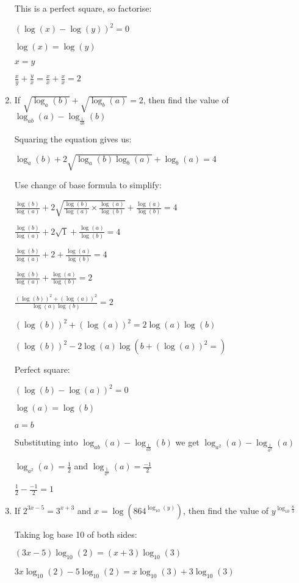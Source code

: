 \documentclass[../main.tex]{subfiles}
\begin{document}
\begin{enumerate}[itemsep=0.4cm]
    This is a perfect square, so factorise:

    \((\log(x)-\log(y))^2=0\)

    \(\log(x)=\log(y)\)

    \(x=y\)

    \(\frac{x}{y}+\frac{y}{x}=\frac{x}{x}+\frac{x}{x}=2\)

    \item 
    If $\sqrt{\log_a(b)}+\sqrt{\log_b(a)}=2$, then find the value of $\log_{ab}(a)-\log_{\frac{1}{ab}}(b)$

    Squaring the equation gives us:

    \(\log_a(b)+2\sqrt{\log_a(b)\log_b(a)}+\log_b(a)=4\)

    Use change of base formula to simplify:

    \(\frac{\log(b)}{\log(a)}+2\sqrt{\frac{\log(b)}{\log(a)}\times \frac{\log(a)}{\log(b)}}+\frac{\log(a)}{\log(b)}=4 \)

    \(\frac{\log(b)}{\log(a)}+2\sqrt{1}+\frac{\log(a)}{\log(b)}=4 \)

    \(\frac{\log(b)}{\log(a)}+2+\frac{\log(a)}{\log(b)}=4 \)

    \(\frac{\log(b)}{\log(a)}+\frac{\log(a)}{\log(b)}=2 \)

    \(\frac{(\log(b))^2+(\log(a))^2}{\log(a)\log(b)} =2\)

    \((\log(b))^2+(\log(a))^2=2\log(a)\log(b)\)

    \((\log(b))^2-2\log(a)\log(b+(\log(a))^2=)\)

    Perfect square:

    \((\log(b)-\log(a))^2=0 \)

    \(\log(a)=\log(b)\)

    \(a=b\)

    Substituting into $\log_{ab}(a)-\log_{\frac{1}{ab}}(b)$ we get $\log_{a^2}(a)-\log_{\frac{1}{a^2}}(a)$

    $\log_{a^2}(a)=\frac{1}{2}$ and $\log_{\frac{1}{a^2}}(a)=\frac{-1}{2}$

    \(\frac{1}{2}-\frac{-1}{2}=1\)


    \item 
    If $2^{3x-5}=3^{x+3}$ and $x=\log(864^{\log_{10}(y)})$, then find the value of $y^{\log_{10}\frac{8}{3}}$

    Taking log base 10 of both sides:

    \((3x-5)\log_{10}(2)=(x+3)\log_{10}(3)\)

    \(3x\log_{10}(2)-5\log_{10}(2)=x\log_{10}(3)+3\log_{10}(3)\)


\end{enumerate}
\end{document}
